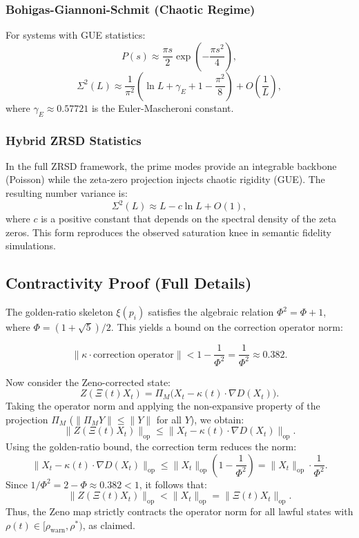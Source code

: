 \documentclass[12pt]{article}
\theoremstyle{plain}
\theoremstyle{definition}
\theoremstyle{remark}
\begin{document}
\subsubsection{Bohigas-Giannoni-Schmit (Chaotic Regime)}
For systems with GUE statistics:
\[
P(s) \approx \frac{\pi s}{2} \exp\left( -\frac{\pi s^2}{4} \right),
\]
\[
\Sigma^2(L) \approx \frac{1}{\pi^2} \left( \ln L + \gamma_E + 1 - \frac{\pi^2}{8} \right) + O\left( \frac{1}{L} \right),
\]
where $\gamma_E \approx 0.57721$ is the Euler-Mascheroni constant.

\subsubsection{Hybrid ZRSD Statistics}
In the full ZRSD framework, the prime modes provide an integrable backbone (Poisson) while the zeta-zero projection injects chaotic rigidity (GUE). The resulting number variance is:
\[
\Sigma^2(L) \approx L - c \ln L + O(1),
\]
where $c$ is a positive constant that depends on the spectral density of the zeta zeros. This form reproduces the observed saturation knee in semantic fidelity simulations.

\subsection{Contractivity Proof (Full Details)}

The golden-ratio skeleton $\xi(p_i)$ satisfies the algebraic relation $\Phi^2 = \Phi + 1$, where $\Phi = (1+\sqrt{5})/2$. This yields a bound on the correction operator norm:

\[
\|\kappa \cdot \text{correction operator}\| < 1 - \frac{1}{\Phi^2} = \frac{1}{\Phi^2} \approx 0.382.
\]

Now consider the Zeno-corrected state:
\[
Z(\Xi(t)X_t) = \Pi_M\bigl( X_t - \kappa(t)\cdot \nabla D(X_t) \bigr).
\]
Taking the operator norm and applying the non-expansive property of the projection $\Pi_M$ ($\|\Pi_M Y\| \leq \|Y\|$ for all $Y$), we obtain:
\[
\|Z(\Xi(t)X_t)\|_{\text{op}}
\leq \|X_t - \kappa(t)\cdot \nabla D(X_t)\|_{\text{op}}.
\]
Using the golden-ratio bound, the correction term reduces the norm:
\[
\|X_t - \kappa(t)\cdot \nabla D(X_t)\|_{\text{op}}
\leq \|X_t\|_{\text{op}} \left( 1 - \frac{1}{\Phi^2} \right)
= \|X_t\|_{\text{op}} \cdot \frac{1}{\Phi^2}.
\]
Since $1/\Phi^2 = 2 - \Phi \approx 0.382 < 1$, it follows that:
\[
\|Z(\Xi(t)X_t)\|_{\text{op}} < \|X_t\|_{\text{op}}
= \|\Xi(t)X_t\|_{\text{op}}.
\]
Thus, the Zeno map strictly contracts the operator norm for all lawful states with $\rho(t) \in [\rho_{\text{warn}}, \rho^*)$, as claimed.
\end{document}
